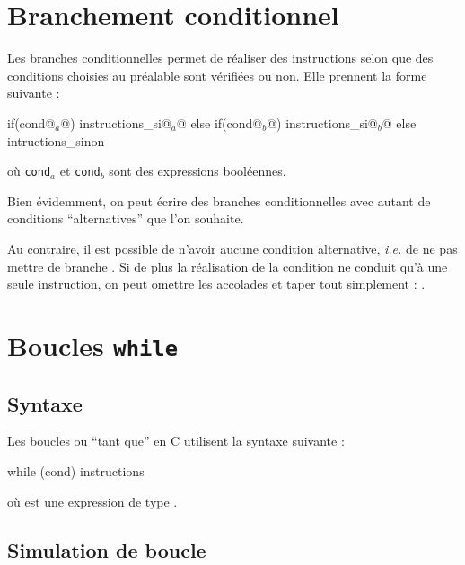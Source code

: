 \section{Branchement conditionnel}

	Les branches conditionnelles permet de réaliser des instructions selon que des conditions choisies au préalable sont vérifiées ou non. Elle prennent la forme suivante :
	\begin{C}
								if(cond@$_a$@){
									instructions_si@$_a$@
								}
								else if(cond@$_b$@){
									instructions_si@$_b$@
								}
								else{
									intructions_sinon
								}
	\end{C}
	où \texttt{cond}$_a$ et \texttt{cond}$_b$ sont des expressions booléennes.
	
	\begin{Remarque}
		Bien évidemment, on peut écrire des branches conditionnelles avec autant de conditions ``alternatives'' que l'on souhaite.
	\end{Remarque}
	
	\begin{Remarque}
		Au contraire, il est possible de n'avoir aucune condition alternative, \emph{i.e.} de ne pas mettre de branche . Si de plus la réalisation de la condition ne conduit qu'à une seule instruction, on peut omettre les accolades et taper tout simplement : . 
	\end{Remarque}

\section{Boucles \texttt{while}}

	\subsection{Syntaxe}
	
		Les boucles  ou ``tant que'' en C utilisent la syntaxe suivante :
			\begin{C}
								while (cond){
									instructions	
								}
			\end{C}
		où  est une expression de type .
		
	\subsection{Simulation de boucle}
		
